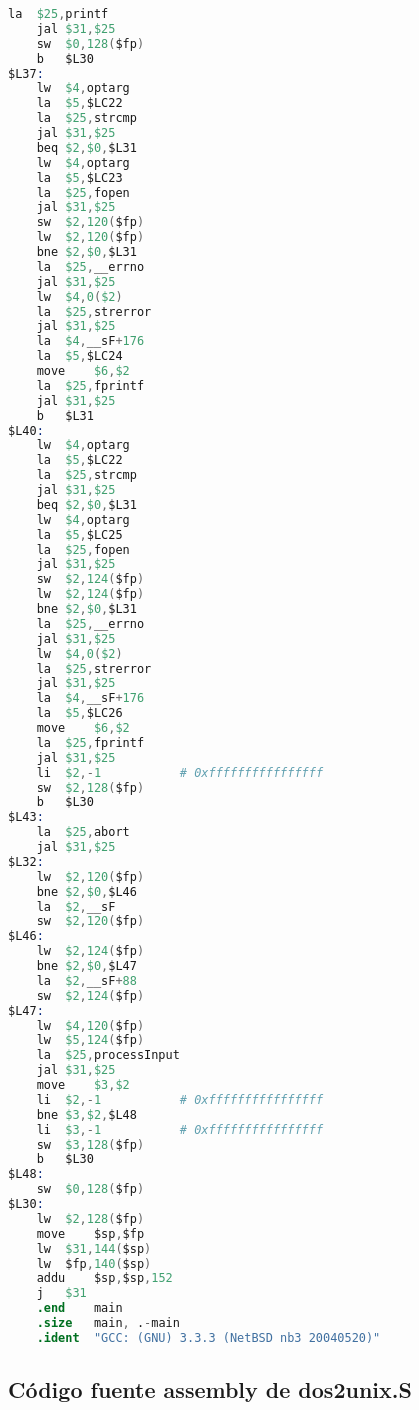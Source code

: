 \documentclass[a4paper]{article}
\begin{document}
\begin{lstlisting}[language=Assembler]
	la	$25,printf
	jal	$31,$25
	sw	$0,128($fp)
	b	$L30
$L37:
	lw	$4,optarg
	la	$5,$LC22
	la	$25,strcmp
	jal	$31,$25
	beq	$2,$0,$L31
	lw	$4,optarg
	la	$5,$LC23
	la	$25,fopen
	jal	$31,$25
	sw	$2,120($fp)
	lw	$2,120($fp)
	bne	$2,$0,$L31
	la	$25,__errno
	jal	$31,$25
	lw	$4,0($2)
	la	$25,strerror
	jal	$31,$25
	la	$4,__sF+176
	la	$5,$LC24
	move	$6,$2
	la	$25,fprintf
	jal	$31,$25
	b	$L31
$L40:
	lw	$4,optarg
	la	$5,$LC22
	la	$25,strcmp
	jal	$31,$25
	beq	$2,$0,$L31
	lw	$4,optarg
	la	$5,$LC25
	la	$25,fopen
	jal	$31,$25
	sw	$2,124($fp)
	lw	$2,124($fp)
	bne	$2,$0,$L31
	la	$25,__errno
	jal	$31,$25
	lw	$4,0($2)
	la	$25,strerror
	jal	$31,$25
	la	$4,__sF+176
	la	$5,$LC26
	move	$6,$2
	la	$25,fprintf
	jal	$31,$25
	li	$2,-1			# 0xffffffffffffffff
	sw	$2,128($fp)
	b	$L30
$L43:
	la	$25,abort
	jal	$31,$25
$L32:
	lw	$2,120($fp)
	bne	$2,$0,$L46
	la	$2,__sF
	sw	$2,120($fp)
$L46:
	lw	$2,124($fp)
	bne	$2,$0,$L47
	la	$2,__sF+88
	sw	$2,124($fp)
$L47:
	lw	$4,120($fp)
	lw	$5,124($fp)
	la	$25,processInput
	jal	$31,$25
	move	$3,$2
	li	$2,-1			# 0xffffffffffffffff
	bne	$3,$2,$L48
	li	$3,-1			# 0xffffffffffffffff
	sw	$3,128($fp)
	b	$L30
$L48:
	sw	$0,128($fp)
$L30:
	lw	$2,128($fp)
	move	$sp,$fp
	lw	$31,144($sp)
	lw	$fp,140($sp)
	addu	$sp,$sp,152
	j	$31
	.end	main
	.size	main, .-main
	.ident	"GCC: (GNU) 3.3.3 (NetBSD nb3 20040520)"

\end{lstlisting}

\subsection{Código fuente assembly de dos2unix.S}
\end{document}
